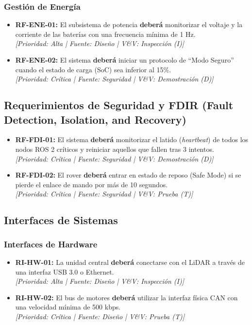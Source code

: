 \subsubsection{Gestión de Energía}
\begin{itemize}[label=---]
    \item \textbf{RF-ENE-01:} El subsistema de potencia \textbf{deberá} monitorizar el voltaje y la corriente de las baterías con una frecuencia mínima de 1 Hz. \\
    \textit{[Prioridad: Alta | Fuente: Diseño | V\&V: Inspección (I)]}
    \item \textbf{RF-ENE-02:} El sistema \textbf{deberá} iniciar un protocolo de ``Modo Seguro'' cuando el estado de carga (SoC) sea inferior al 15\%. \\
    \textit{[Prioridad: Crítica | Fuente: Seguridad | V\&V: Demostración (D)]}
\end{itemize}

\subsection{Requerimientos de Seguridad y FDIR (Fault Detection, Isolation, and Recovery)}
\begin{itemize}[label=---]
    \item \textbf{RF-FDI-01:} El sistema \textbf{deberá} monitorizar el latido (\textit{heartbeat}) de todos los nodos ROS 2 críticos y reiniciar aquellos que fallen tras 3 intentos. \\
    \textit{[Prioridad: Crítica | Fuente: Seguridad | V\&V: Demostración (D)]}
    \item \textbf{RF-FDI-02:} El rover \textbf{deberá} entrar en estado de reposo (Safe Mode) si se pierde el enlace de mando por más de 10 segundos. \\
    \textit{[Prioridad: Crítica | Fuente: Seguridad | V\&V: Prueba (T)]}
\end{itemize}

\subsection{Interfaces de Sistemas}

\subsubsection{Interfaces de Hardware}
\begin{itemize}[label=---]
    \item \textbf{RI-HW-01:} La unidad central \textbf{deberá} conectarse con el LiDAR a través de una interfaz USB 3.0 o Ethernet. \\
    \textit{[Prioridad: Alta | Fuente: Diseño | V\&V: Inspección (I)]}
    \item \textbf{RI-HW-02:} El bus de motores \textbf{deberá} utilizar la interfaz física CAN con una velocidad mínima de 500 kbps. \\
    \textit{[Prioridad: Crítica | Fuente: Diseño | V\&V: Prueba (T)]}
\end{itemize}

